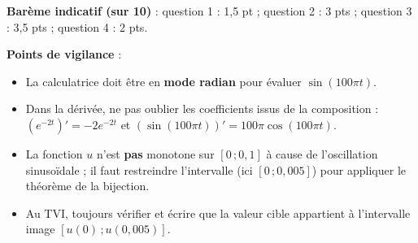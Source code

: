 \documentclass[11pt]{article}
\begin{document}
\begin{corrige}
\textbf{Barème indicatif (sur 10)} : question 1 : 1,5 pt ; question 2 : 3 pts ; question 3 : 3,5 pts ; question 4 : 2 pts.

\textbf{Points de vigilance} :
\begin{itemize}
\item La calculatrice doit être en \textbf{mode radian} pour évaluer $\sin(100\pi t)$.
\item Dans la dérivée, ne pas oublier les coefficients issus de la composition : $(e^{-2t})'=-2e^{-2t}$ et $(\sin(100\pi t))'=100\pi\cos(100\pi t)$.
\item La fonction $u$ n'est \textbf{pas} monotone sur $[0\,;0{,}1]$ à cause de l'oscillation sinusoïdale ; il faut restreindre l'intervalle (ici $[0\,;0{,}005]$) pour appliquer le théorème de la bijection.
\item Au TVI, toujours vérifier et écrire que la valeur cible appartient à l'intervalle image $[u(0)\,;u(0{,}005)]$.
\end{itemize}
\end{corrige}
\end{document}
